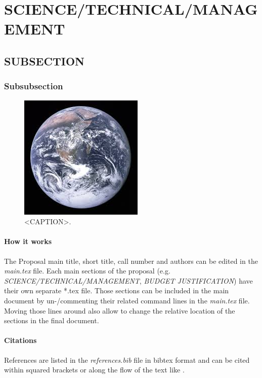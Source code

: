 \section{SCIENCE/TECHNICAL/MANAGEMENT}


\subsection{SUBSECTION}

\subsubsection{Subsubsection}

\begin{figure}
  \vspace{-1em}
  \noindent\small\includegraphics[width=.3\textwidth]{figures/_earth.jpg}
  \caption{<CAPTION>.}
  \vspace{-3em}
  \label{fig:_earth}
\end{figure}

\paragraph{How it works}
The Proposal main title, short title, call number and authors can be edited in the \emph{main.tex} file. 
Each main sections of the proposal (e.g. \emph{SCIENCE/TECHNICAL/MANAGEMENT}, \emph{BUDGET JUSTIFICATION}) have their own separate *.tex file. Those sections can be included in the main document by un-/commenting their related command lines in the \emph{main.tex} file. Moving those lines around also allow to change the relative location of the sections in the final document.

\paragraph{Citations} References are listed in the \emph{references.bib} file in bibtex format and can be cited within squared brackets \citep[e.g.][]{Campbell1969} or along the flow of the text like \citet{Campbell1969}.


